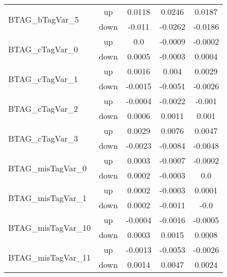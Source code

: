 \begin{table}[h!]
\begin{tabular}{lcccc}
\multirow{2}{*}{BTAG\_bTagVar\_5}      & up   &     0.0118     &     0.0246     &     0.0187      \\
                                       & down &     -0.011     &     -0.0262     &     -0.0186       \\ \hline
\multirow{2}{*}{BTAG\_cTagVar\_0}      & up   &     0.0     &     -0.0009     &     -0.0002      \\
                                       & down &     0.0005     &     -0.0003     &     0.0004       \\ \hline
\multirow{2}{*}{BTAG\_cTagVar\_1}      & up   &     0.0016     &     0.004     &     0.0029      \\
                                       & down &     -0.0015     &     -0.0051     &     -0.0026       \\ \hline
\multirow{2}{*}{BTAG\_cTagVar\_2}      & up   &     -0.0004     &     -0.0022     &     -0.001      \\
                                       & down &     0.0006     &     0.0011     &     0.001       \\ \hline
\multirow{2}{*}{BTAG\_cTagVar\_3}      & up   &     0.0029     &     0.0076     &     0.0047      \\
                                       & down &     -0.0023     &     -0.0084     &     -0.0048       \\ \hline
\multirow{2}{*}{BTAG\_misTagVar\_0}      & up   &     0.0003     &     -0.0007     &     -0.0002      \\
                                       & down &     0.0002     &     -0.0003     &     0.0       \\ \hline
\multirow{2}{*}{BTAG\_misTagVar\_1}      & up   &     0.0002     &     -0.0003     &     0.0001      \\
                                       & down &     0.0002     &     -0.0011     &     -0.0       \\ \hline
\multirow{2}{*}{BTAG\_misTagVar\_10}      & up   &     -0.0004     &     -0.0016     &     -0.0005      \\
                                       & down &     0.0003     &     0.0015     &     0.0008       \\ \hline
\multirow{2}{*}{BTAG\_misTagVar\_11}      & up   &     -0.0013     &     -0.0053     &     -0.0026      \\
                                       & down &     0.0014     &     0.0047     &     0.0024       \\ \hline

\end{tabular}
\end{table}
